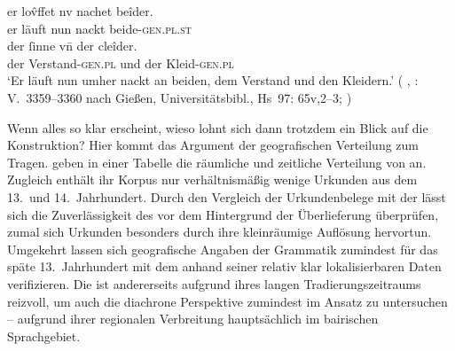 \begin{exe}
\ex \label{ex:gendatconj}
	\begin{xlist}
	\ex \label{ex:gendatconj_1}
		\gll er lov̂ffet nv nachet beîder. \\
			er läuft nun nackt beide-\textsc{gen.pl.st} \\
	\sn \gll der ſinne vn̄ der cleîder. \\
			der Verstand-\textsc{gen.pl} und der
				Kleid-\textsc{gen.pl} \\
		\trans `Er läuft nun umher nackt an beiden, dem
			Verstand und den Kleidern.'
			(%
				, : V.~3359--3360 nach
				Gießen, Universitätsbibl., Hs~97: 65v,2--3;
				\cite[vgl.][500]{mertens2004}%
			)

	\end{xlist}
\end{exe}
%

Wenn alles so klar erscheint, wieso lohnt sich dann trotzdem ein Blick auf die
Konstruktion? Hier kommt das Argument der geografischen Verteilung zum Tragen.
\citet[627]{ksw2} geben in einer Tabelle die räumliche und zeitliche Verteilung
von  an. Zugleich enthält ihr Korpus nur verhältnismäßig wenige
Urkunden aus dem 13.\ und 14.\ Jahrhundert.
Durch den Vergleich der Urkundenbelege mit der
 lässt sich die
Zuverlässigkeit des \CAO{} vor dem Hintergrund der Überlieferung überprüfen,
zumal sich Urkunden besonders durch ihre kleinräumige Auflösung hervortun.
Umgekehrt lassen sich geografische Angaben der Grammatik zumindest für das
späte 13.~Jahrhundert mit dem \CAO{} anhand seiner relativ klar lokalisierbaren
Daten verifizieren. Die \KC{} ist andererseits aufgrund ihres langen
Tradierungs\-zeitraums reizvoll, um auch die diachrone Perspektive zumindest im
Ansatz zu untersuchen -- aufgrund ihrer regionalen Verbreitung hauptsächlich im
bairischen Sprachgebiet.
